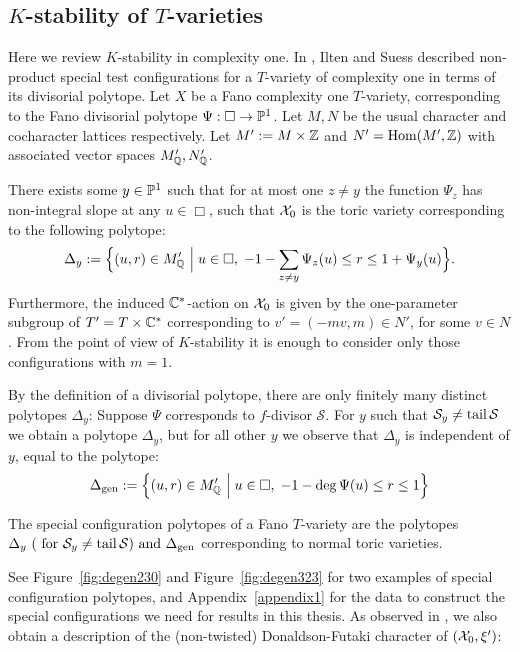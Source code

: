\subsection{$K$-stability of $T$-varieties} \label{subsec:IS}
Here we review \(K\)-stability in complexity one. In \cite{ilten2015}, Ilten and Suess described non-product special test configurations for a \(T\)-variety of complexity one in terms of its divisorial polytope. Let \(X\) be a Fano complexity one \(T\)-variety, corresponding to the Fano divisorial polytope \(\Psi : \Box \to \mathbb{P}^1\). Let \(M,N\) be the usual character and cocharacter lattices respectively. Let \(M' := M \times \mathbb{Z}\) and \(N' = \operatorname{Hom}(M',\mathbb{Z})\) with associated vector spaces \(M_{\mathbb{Q}}', N_{\mathbb{Q}}'\).
\begin{theorem} \label{thm:iltensueskstab}
There exists some \(y \in \mathbb{P}^1\) such that for at most one \(z \neq y\) the function \(\Psi_z\) has non-integral slope at any \(u \in \Box\), such that \({\mathcal{X}}_0\) is the toric variety corresponding to the following polytope:
\begin{equation*}
\Delta_y := \Big\{(u,r) \in M_{\mathbb{Q}}' \ \Big| \; u \in \Box,\; -1-\sum_{z \neq y} \Psi_z(u) \leq r \leq 1+\Psi_y(u)\Big\}.\label{eq:special-fibre}
\end{equation*}
Furthermore, the induced \(\mathbb{C}^*\)-action on \({\mathcal{X}}_0\) is given by the one-parameter subgroup of \(T' = T \times \mathbb{C}^*\) corresponding to \(v'=(-mv,m) \in N'\), for some \(v \in N\). From the point of view of \(K\)-stability it is enough to consider only those configurations with \(m=1\). 
\end{theorem}
By the definition of a divisorial polytope, there are only finitely many distinct polytopes \(\Delta_y\): Suppose \(\Psi\) corresponds to \(f\)-divisor \(\mathcal{S}\). For \(y\) such that \(\mathcal{S}_y \neq \operatorname{tail} \mathcal{S}\) we obtain a polytope \(\Delta_y\), but for all other \(y\) we observe that \(\Delta_y\) is independent of \(y\), equal to the polytope: 
\[
\Delta_{\operatorname{gen}} := \Big\{(u,r) \in M_{\mathbb{Q}}' \ \Big| \; u \in \Box,\; -1- \deg \Psi (u) \leq r \leq 1\Big\}
\]
\begin{definition}
The special configuration polytopes of a Fano \(T\)-variety are the polytopes \( \Delta_y \ (\text{ for } \mathcal{S}_y \neq \operatorname{tail} \mathcal{S} )  \text{ and } \Delta_{\operatorname{gen}} \) corresponding to normal toric varieties.
\end{definition}
See Figure~\ref{fig:degen230} and Figure~\ref{fig:degen323} for two examples of special configuration polytopes, and Appendix~\ref{appendix1} for the data to construct the special configurations we need for results in this thesis. As observed in \cite{ilten2015}, we also obtain a description of the (non-twisted) Donaldson-Futaki character of $({\mathcal{X}}_0,\xi')$:
